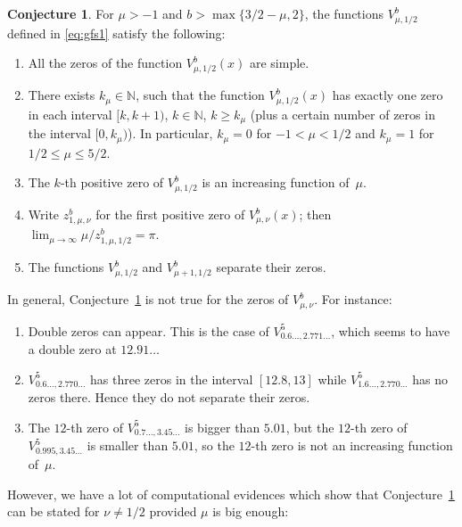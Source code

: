 \documentclass[10pt,a4paper]{article}
\numberwithin{equation}{section}
\theoremstyle{plain}
\theoremstyle{definition}
\newtheorem{Conjecture}{Conjecture}[section]
\newcommand{\NN}{\mathbb{N}}
\begin{document}
\begin{Conjecture}
\label{conj:V}
For $\mu>-1$ and $b > \max\{3/2-\mu,2\}$, the functions $V_{\mu,1/2}^{b}$ defined in \eqref{eq:gfs1} satisfy the following:
\begin{enumerate}
\item All the zeros of the function $V_{\mu,1/2}^{b}(x)$ are simple.
\item There exists $k_{\mu}\in \NN$, such that the function $V_{\mu,1/2}^{b}(x)$ has exactly one zero in each interval $[k,k+1)$, $k\in \NN$, $k\ge k_{\mu}$ (plus a certain number of zeros in the interval $[0,k_{\mu})$). In particular, $k_{\mu}=0$ for $-1< \mu < 1/2$ and $k_{\mu}=1$ for $1/2\le \mu \le 5/2$.
\item The $k$-th positive zero of $V_{\mu,1/2}^{b}$ is an increasing function of~$\mu$.
\item Write $z_{1,\mu,\nu}^b$ for the first positive zero of $V_{\mu,\nu}^{b}(x)$; then
$
   \lim_{\mu\to \infty} {\mu}/{z_{1,\mu,1/2}^b} = \pi .
$
\item The functions $V_{\mu,1/2}^{b}$ and $V_{\mu+1,1/2}^{b}$ separate their zeros.
\end{enumerate}
\end{Conjecture}

In general, Conjecture~\ref{conj:V} is not true for the zeros of $V_{\mu,\nu}^{b}$. For instance:
\begin{enumerate}
\item Double zeros can appear. This is the case of $V_{0.6\dots, 2.771\dots}^{5}$, which seems to have a double zero at $12.91\dots$

\item $V_{0.6\dots,2.770\dots}^5$ has three zeros in the interval $[12.8,13]$ while $V_{1.6\dots,2.770\dots}^5$ has no zeros there. Hence they do not separate their zeros.

\item The $12$-th zero of $V_{0.7\dots,3.45\dots}^5$ is bigger than $5.01$, but the $12$-th zero of $V_{0.995,3.45\dots}^5$ is smaller than $5.01$, so the $12$-th zero is not an increasing function of~$\mu$.
\end{enumerate}

However, we have a lot of computational evidences which show that Conjecture~\ref{conj:V} can be stated for $\nu\not =1/2$ provided $\mu$ is big enough:
\end{document}
